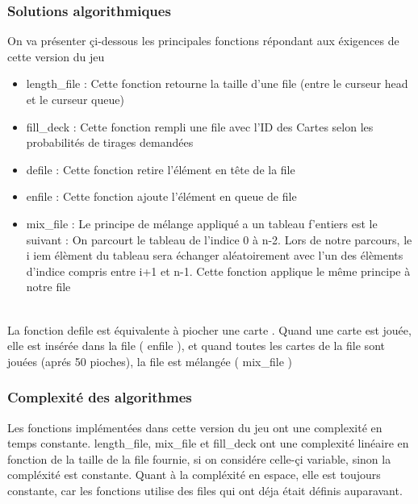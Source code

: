 \documentclass[a4paper]{article}
\begin{document}
\subsubsection{Solutions algorithmiques}
On va présenter çi-dessous les principales fonctions répondant aux éxigences de cette version du jeu\\
\begin{itemize}  

\item length\_file : Cette fonction retourne la taille d'une file (entre le curseur head et le curseur queue) \\
\item fill\_deck  : Cette fonction rempli une file avec l'ID des Cartes selon les probabilités de tirages demandées\\
\item defile : Cette fonction retire l'élément en tête de la file \\
\item enfile  : Cette fonction ajoute l'élément en queue de file \\
\item mix\_file  : Le principe de mélange appliqué a un tableau f'entiers est le suivant : On parcourt le tableau de l'indice 0 à n-2. Lors de notre parcours, le i iem élèment du tableau sera échanger aléatoirement avec l'un des élèments d'indice compris entre i+1 et n-1. Cette fonction applique le même principe à notre file\\\\
\end{itemize}

La fonction defile est équivalente à piocher une carte . Quand une carte est jouée, elle est insérée dans la file ( enfile ), et quand toutes les cartes de la file sont jouées (aprés 50 pioches), la file est mélangée ( mix\_file )


\subsubsection{Complexité des algorithmes}

Les fonctions implémentées dans cette version du jeu ont une complexité en temps constante. length\_file, mix\_file et fill\_deck ont une complexité linéaire en fonction de la taille de la file fournie, si on considére celle-çi variable, sinon la compléxité est constante. Quant à la compléxité en espace, elle est toujours constante, car les fonctions utilise des files qui ont déja était définis auparavant.
\end{document}
